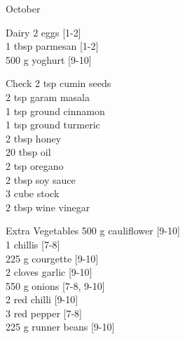 \begin{menu}{October}
\begin{shoppinglist}{Dairy}
      2  eggs {\scriptsize[1-2]}\\
      1 tbsp parmesan {\scriptsize[1-2]}\\
      500 g yoghurt {\scriptsize[9-10]}\\
      \end{shoppinglist}%
      \par\vfil %
      \vfil\clearpage %
      \begin{shoppinglist}{Check}
      2 tsp cumin seeds \\
      2 tsp garam masala \\
      1 tsp ground cinnamon \\
      1 tsp ground turmeric \\
      2 tbsp honey \\
      20 tbsp oil \\
      2 tsp oregano \\
      2 tbsp soy sauce \\
      3 cube stock \\
      2 tbsp wine vinegar \\
      \end{shoppinglist}%
      \begin{shoppinglist}{Extra Vegetables}
      500 g cauliflower {\scriptsize[9-10]}\\
      1  chillis {\scriptsize[7-8]}\\
      225 g courgette {\scriptsize[9-10]}\\
      2 cloves garlic {\scriptsize[9-10]}\\
      550 g onions {\scriptsize[7-8, 9-10]}\\
      2  red chilli {\scriptsize[9-10]}\\
      3  red pepper {\scriptsize[7-8]}\\
      225 g runner beans {\scriptsize[9-10]}\\
      \end{shoppinglist}%
      \par\vfil %
    \vfil\clearpage
  

\end{menu}

